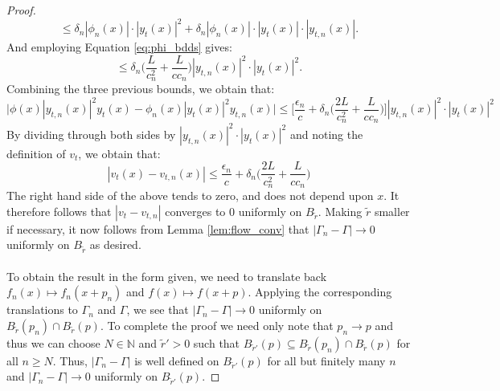 \documentclass[11pt]{article}
\newcommand{\1}{\mathbf{1}}
\theoremstyle{definition}
\theoremstyle{remark}
\begin{document}
\begin{proof}
    \begin{equation}\nonumber
        \leq \delta_n |\phi_n(x)|\cdot |y_t(x)|^2 +\delta_n |\phi_n(x)|\cdot|y_t(x)|\cdot|y_{t,n}(x)|.
    \end{equation}
    And employing Equation \eqref{eq:phi_bdds} gives:
    \begin{equation}\nonumber
        \leq \delta_n \bigg(\frac{L}{c_n^2}+\frac{L}{cc_n}\bigg)|y_{t,n}(x)|^2\cdot |y_t(x)|^2.
    \end{equation}
    Combining the three previous bounds, we obtain that:
    \begin{equation}\nonumber
        \bigg|\phi(x)|y_{t,n}(x)|^2 y_t(x)-\phi_n(x)|y_t(x)|^2 y_{t,n}(x)\bigg| \leq \bigg[\frac{\epsilon_n}{c}+\delta_n\bigg(\frac{2L}{c_n^2}+\frac{L}{cc_n}\bigg)\bigg]|y_{t,n}(x)|^2\cdot |y_t(x)|^2
    \end{equation}
    By dividing through both sides by $|y_{t,n}(x)|^2\cdot |y_t(x)|^2$ and noting the definition of $v_t$, we obtain that:
    \begin{equation}\nonumber
        |v_t(x)-v_{t,n}(x)| \leq \frac{\epsilon_n}{c}+\delta_n\bigg(\frac{2L}{c_n^2}+\frac{L}{cc_n}\bigg)
    \end{equation}
    The right hand side of the above tends to zero, and does not depend upon $x$. It therefore follows that $|v_t-v_{t,n}|$ converges to $0$ uniformly on $B_{\tilde{r}}$. Making $\tilde{r}$ smaller if necessary, it now follows from Lemma \ref{lem:flow_conv} that $|\Gamma_n-\Gamma|\rightarrow 0$ uniformly on $B_{\tilde{r}}$ as desired.\\
    \\
    To obtain the result in the form given, we need to translate back $f_n(x)\mapsto f_n(x+p_n)$ and $f(x)\mapsto f(x+p)$. Applying the corresponding translations to $\Gamma_n$ and $\Gamma$, we see that $|\Gamma_n-\Gamma|\rightarrow 0$ uniformly on $B_{\tilde{r}}(p_n)\cap B_{\tilde{r}}(p)$. To complete the proof we need only note that $p_n\rightarrow p$ and thus we can choose $N\in\mathbb{N}$ and $\tilde{r}'>0$ such that $B_{\tilde{r}'}(p)\subseteq B_{\tilde{r}}(p_n)\cap B_{\tilde{r}}(p)$ for all $n\geq N$. Thus, $|\Gamma_n-\Gamma|$ is well defined on $B_{\tilde{r}'}(p)$ for all but finitely many $n$ and $|\Gamma_n-\Gamma|\rightarrow 0$ uniformly on $B_{\tilde{r}'}(p)$.
\end{proof}
\end{document}
